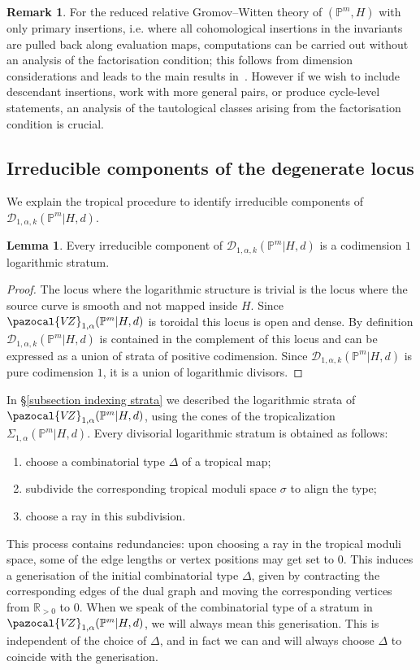 \documentclass[11pt]{amsart}
\newcommand{\PP}{\mathbb P}
\newcommand{\VZ}{\pazocal{V\!Z}}
\newcommand{\Dcal}{\mathcal{D}}
\newcommand{\RR}{\mathbb{R}}
\theoremstyle{definition}
\newtheorem{lemma}[thm]{Lemma}
\theoremstyle{definition}
\newtheorem{remark}[thm]{Remark}
\begin{document}
\begin{remark} For the reduced relative Gromov--Witten theory of $(\mathbb P^m,H)$ with only primary insertions, i.e. where all cohomological insertions in the invariants are pulled back along evaluation maps, computations can be carried out without an analysis of the factorisation condition; this follows from dimension considerations and leads to the main results in~\cite{Vre}. However if we wish to include descendant insertions, work with more general pairs, or produce cycle-level statements, an analysis of the tautological classes arising from the factorisation condition is crucial.
\end{remark}

\subsection{Irreducible components of the degenerate locus} We explain the tropical procedure to identify irreducible components of $\Dcal_{1,\alpha,k}(\PP^m|H,d)$.

\begin{lemma} \label{Lemma components are logarithmic divisors} Every irreducible component of $\Dcal_{1,\alpha,k}(\PP^m|H,d)$ is a codimension $1$ logarithmic stratum.\end{lemma}

\begin{proof} The locus where the logarithmic structure is trivial is the locus where the source curve is smooth and not mapped inside $H$. Since $\VZ_{1,\alpha}(\PP^m|H,d)$ is toroidal this locus is open and dense. By definition $\Dcal_{1,\alpha,k}(\PP^m|H,d)$ is contained in the  complement of this locus and can be expressed as a union of strata of positive codimension. Since $\Dcal_{1,\alpha,k}(\PP^m|H,d)$ is pure codimension $1$, it is a union of logarithmic divisors.\end{proof}

\noindent In \S \ref{subsection indexing strata} we described the logarithmic strata of $\VZ_{1,\alpha}(\PP^m|H,d)$, using the cones of the tropicalization $\Sigma_{1,\alpha}(\PP^m|H,d)$. Every divisorial logarithmic stratum is obtained as follows:
\begin{enumerate}
\item choose a combinatorial type $\Delta$ of a tropical map;
\item subdivide the corresponding tropical moduli space $\sigma$ to align the type;
\item choose a ray in this subdivision.
\end{enumerate}
This process contains redundancies: upon choosing a ray in the tropical moduli space, some of the edge lengths or vertex positions may get set to $0$. This induces a generisation of the initial combinatorial type $\Delta$, given by contracting the corresponding edges of the dual graph and moving the corresponding vertices from $\RR_{>0}$ to $0$. When we speak of the combinatorial type of a stratum in $\VZ_{1,\alpha}(\PP^m|H,d)$, we will always mean this generisation. This is independent of the choice of $\Delta$, and in fact we can and will always choose $\Delta$ to coincide with the generisation.
\end{document}
